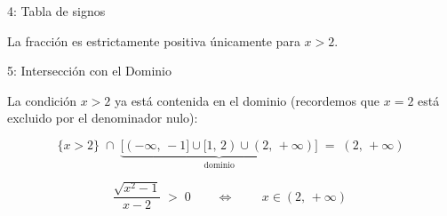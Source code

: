 \documentclass[letterpaper, 12pt]{article}
\begin{document}
\begin{paso}{4: Tabla de signos}
\begin{center}
\end{center}

\medskip
La fracción es estrictamente positiva únicamente para $x > 2$.

\end{paso}

\bigskip

\begin{paso}{5: Intersección con el Dominio}

La condición $x > 2$ ya está contenida en el dominio
(recordemos que $x = 2$ está excluido por el denominador nulo):

\[
    \bigl\{x > 2\bigr\}
    \;\cap\;
    \underbrace{\bigl[(-\infty,\,-1]\cup[1,\,2)\cup(2,\,+\infty)\bigr]}_{\text{dominio}}
    \;=\;
    (2,\,+\infty)
\]

\end{paso}

\bigskip

\begin{resultado}
\[
    \dfrac{\sqrt{x^2 - 1}}{x - 2} \;>\; 0
    \qquad\Longleftrightarrow\qquad
    \boxed{\,x \in (2,\,+\infty)\,}
\]
\end{resultado}
\end{document}
